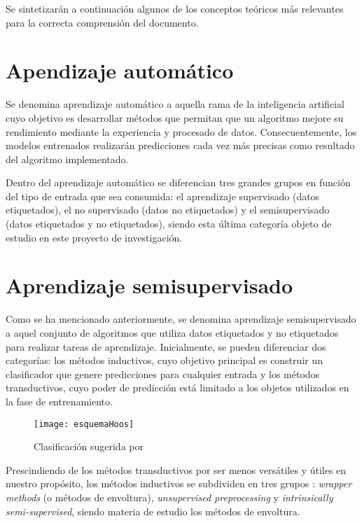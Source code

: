 
Se sintetizarán a continuación algunos de los conceptos teóricos más relevantes para la correcta comprensión del documento.

\section{Apendizaje automático}

Se denomina aprendizaje automático a aquella rama de la inteligencia artificial cuyo objetivo es desarrollar métodos que permitan que un algoritmo mejore su rendimiento mediante la experiencia y procesado de datos. Consecuentemente, los modelos entrenados realizarán predicciones cada vez más precisas como resultado del algoritmo implementado.

Dentro del aprendizaje automático se diferencian tres grandes grupos en función del tipo de entrada que sea consumida: el aprendizaje supervisado (datos etiquetados), el no supervisado (datos no etiquetados) y el semisupervisado (datos etiquetados y no etiquetados), siendo esta última categoría objeto de estudio en este proyecto de investigación. 

\section{Aprendizaje semisupervisado}

Como se ha mencionado anteriormente, se denomina aprendizaje semisupervisado a aquel conjunto de algoritmos que utiliza datos etiquetados y no etiquetados para realizar tareas de aprendizaje. Inicialmente, se pueden diferenciar dos categorías\cite{engelen2020surveyOnSemiSupervised}: los métodos inductivos, cuyo objetivo principal es construir un clasificador que genere predicciones para cualquier entrada y los métodos transductivos, cuyo poder de predicción está limitado a los objetos utilizados en la fase de entrenamiento.


\begin{figure}[h]
\caption{Clasificación sugerida por \cite{engelen2020surveyOnSemiSupervised}}
\centering
\texttt{[image: esquemaHoos]}
\end{figure}

Prescindiendo de los métodos transductivos por ser menos versátiles y útiles en nuestro propósito, los métodos inductivos se subdividen en tres grupos \cite{engelen2020surveyOnSemiSupervised}: \textit{wrapper methods} (o métodos de envoltura), \textit{unsupervised preprocessing} y \textit{intrinsically semi-supervised}, siendo materia de estudio los métodos de envoltura. 


